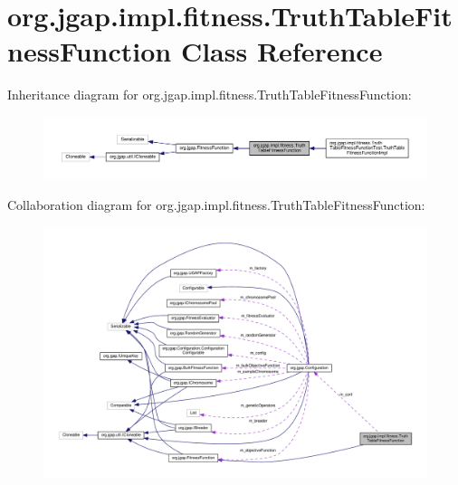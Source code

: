 \hypertarget{classorg_1_1jgap_1_1impl_1_1fitness_1_1_truth_table_fitness_function}{\section{org.\-jgap.\-impl.\-fitness.\-Truth\-Table\-Fitness\-Function Class Reference}
\label{classorg_1_1jgap_1_1impl_1_1fitness_1_1_truth_table_fitness_function}
}


Inheritance diagram for org.\-jgap.\-impl.\-fitness.\-Truth\-Table\-Fitness\-Function\-:
\nopagebreak
\begin{figure}[H]
\begin{center}
\leavevmode
\includegraphics[width=350pt]{classorg_1_1jgap_1_1impl_1_1fitness_1_1_truth_table_fitness_function__inherit__graph}
\end{center}
\end{figure}


Collaboration diagram for org.\-jgap.\-impl.\-fitness.\-Truth\-Table\-Fitness\-Function\-:
\nopagebreak
\begin{figure}[H]
\begin{center}
\leavevmode
\includegraphics[width=350pt]{classorg_1_1jgap_1_1impl_1_1fitness_1_1_truth_table_fitness_function__coll__graph}
\end{center}
\end{figure}
